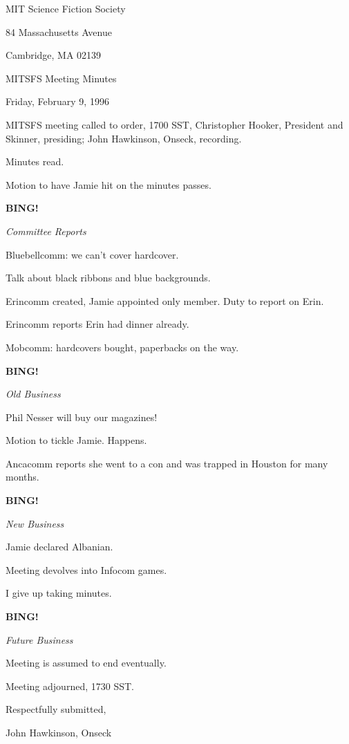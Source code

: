 \documentclass[12pt]{article}
\newcommand{\bing}{{\bf BING!} }
\newcommand{\goto}[1]{\bing \vskip 12pt \centerline{{\em{#1}}}}
\begin{document}
\begin{center}

MIT Science Fiction Society 

84 Massachusetts Avenue

Cambridge, MA 02139

\vspace{12pt}

MITSFS Meeting Minutes 

Friday, February 9, 1996

\end{center}
 
\vspace{18pt}

\setlength{\parskip}{6pt}

\noindent
MITSFS meeting called to order, 1700 SST,
Christopher Hooker, President and Skinner, presiding; John Hawkinson, Onseck, recording.

Minutes read.

Motion to have Jamie hit on the minutes passes.

\goto{Committee Reports}

Bluebellcomm: we can't cover hardcover.

Talk about black ribbons and blue backgrounds.

Erincomm created, Jamie appointed only member. Duty to report on Erin.

Erincomm reports Erin had dinner already.

Mobcomm: hardcovers bought, paperbacks on the way.

\goto{Old Business}

Phil Nesser will buy our magazines!

Motion to tickle Jamie. Happens.

Ancacomm reports she went to a con and was trapped in Houston for many months.

\goto{New Business}

Jamie declared Albanian.

Meeting devolves into Infocom games.

I give up taking minutes.

\goto{Future Business}

Meeting is assumed to end eventually.

\vspace{12pt}

\noindent
Meeting adjourned, 1730 SST.

\vspace{18pt}

\centerline{Respectfully submitted,}
\centerline{John Hawkinson, Onseck}
\end{document}
